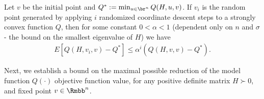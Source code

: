 \documentclass[11pt]{article}
\numberwithin{equation}{section}
\begin{document}
\begin{lemma}\label{lem:randomized_CD}

Let $v$ be the initial point and $Q^* := \min_{u\in\br^n} Q(H, u,v)$. If $v_i$ is the random point generated by applying $i$ randomized coordinate descent steps to a strongly convex function $Q$, then for some constant $0 < \alpha < 1$ (dependent only on $n$ and $\sigma$ - the bound on the smallest eigenvalue of $H$) we have
\begin{align}
    E[Q(H,v_i,v) - Q^*] \leq  \alpha^i (Q(H,v,v) - Q^*).
\end{align}
\end{lemma}

Next, we establish a bound on the maximal possible reduction of the model function $Q(\cdot)$ objective function value, for any positive definite matrix $H \succ 0$,  and fixed point $v \in \Rmbb^n$. 
\end{document}
